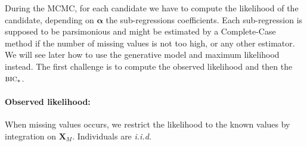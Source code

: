 \documentclass[12pt,a4paper]{report}
\begin{document}
	 During the MCMC, for each candidate we have to compute the likelihood of the candidate, depending on $\boldsymbol{\alpha}$ the sub-regressions coefficients. Each sub-regression is supposed to be parsimonious and might be estimated by a Complete-Case method if the number of missing values is not too high, or any other estimator. We will see later how to use the generative model and maximum likelihood instead. The first challenge is to compute the observed likelihood and then the $\textsc{bic}_*$. \\
	 

\paragraph{Observed likelihood:} 
%
	 When missing values occurs, we restrict the likelihood to the known values by integration on $\boldsymbol{X}_M$. Individuals are {\it i.i.d.}
\end{document}
